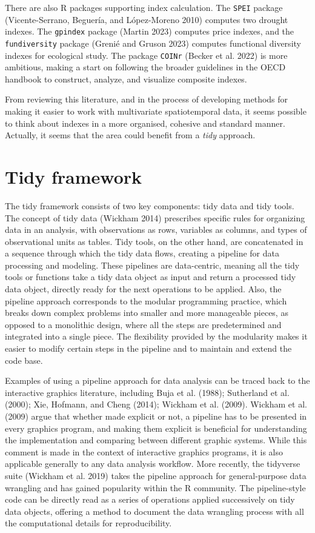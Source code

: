 \documentclass[
]{interact}
\begin{document}
There are also R packages supporting index calculation. The
\texttt{SPEI} package (Vicente-Serrano, Beguería, and López-Moreno 2010)
computes two drought indexes. The \texttt{gpindex} package (Martin 2023)
computes price indexes, and the \texttt{fundiversity} package (Grenié
and Gruson 2023) computes functional diversity indexes for ecological
study. The package \texttt{COINr} (Becker et al. 2022) is more
ambitious, making a start on following the broader guidelines in the
OECD handbook to construct, analyze, and visualize composite indexes.

From reviewing this literature, and in the process of developing methods
for making it easier to work with multivariate spatiotemporal data, it
seems possible to think about indexes in a more organised, cohesive and
standard manner. Actually, it seems that the area could benefit from a
\emph{tidy} approach.

\hypertarget{sec-tidy}{%
\section{Tidy framework}\label{sec-tidy}}

The tidy framework consists of two key components: tidy data and tidy
tools. The concept of tidy data (Wickham 2014) prescribes specific rules
for organizing data in an analysis, with observations as rows, variables
as columns, and types of observational units as tables. Tidy tools, on
the other hand, are concatenated in a sequence through which the tidy
data flows, creating a pipeline for data processing and modeling. These
pipelines are data-centric, meaning all the tidy tools or functions take
a tidy data object as input and return a processed tidy data object,
directly ready for the next operations to be applied. Also, the pipeline
approach corresponds to the modular programming practice, which breaks
down complex problems into smaller and more manageable pieces, as
opposed to a monolithic design, where all the steps are predetermined
and integrated into a single piece. The flexibility provided by the
modularity makes it easier to modify certain steps in the pipeline and
to maintain and extend the code base.

Examples of using a pipeline approach for data analysis can be traced
back to the interactive graphics literature, including Buja et al.
(1988); Sutherland et al. (2000); Xie, Hofmann, and Cheng (2014);
Wickham et al. (2009). Wickham et al. (2009) argue that whether made
explicit or not, a pipeline has to be presented in every graphics
program, and making them explicit is beneficial for understanding the
implementation and comparing between different graphic systems. While
this comment is made in the context of interactive graphics programs, it
is also applicable generally to any data analysis workflow. More
recently, the tidyverse suite (Wickham et al. 2019) takes the pipeline
approach for general-purpose data wrangling and has gained popularity
within the R community. The pipeline-style code can be directly read as
a series of operations applied successively on tidy data objects,
offering a method to document the data wrangling process with all the
computational details for reproducibility.
\end{document}
